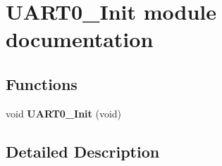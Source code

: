 \hypertarget{group___u_a_r_t0___init__module}{}\section{U\+A\+R\+T0\+\_\+\+Init module documentation}
\label{group___u_a_r_t0___init__module}
\subsection*{Functions}
\begin{DoxyCompactItemize}
\item 
void {\bfseries U\+A\+R\+T0\+\_\+\+Init} (void)\hypertarget{group___u_a_r_t0___init__module_ga69350c8eda537c8519bf9a556b579c47}{}\label{group___u_a_r_t0___init__module_ga69350c8eda537c8519bf9a556b579c47}

\end{DoxyCompactItemize}


\subsection{Detailed Description}
